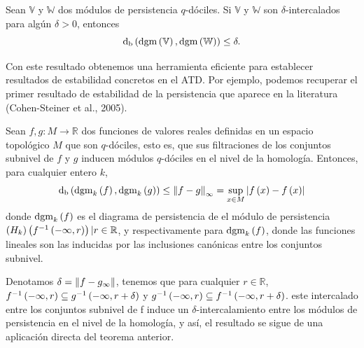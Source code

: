 \begin{teorema}\label{teo:EstPersist}
    Sean $\mathbb{V}$ y $\mathbb{W}$ dos m\'odulos de persistencia $q$-d\'ociles.
    Si $\mathbb{V}$ y $\mathbb{W}$ son $\delta$-intercalados para alg\'un $\delta>0$,
    entonces
    \begin{equation*}
        \mathrm{d}_{\mathrm{b}}
        \left(\mathrm{dgm}\left(\mathbb{V}\right),\mathrm{dgm}\left(\mathbb{W}\right)\right)\leq\delta.
    \end{equation*}
\end{teorema}

Con este resultado obtenemos una herramienta eficiente para establecer resultados de
estabilidad concretos en el ATD. Por ejemplo, podemos recuperar el primer resultado de
estabilidad de la persistencia que aparece en la literatura
(Cohen-Steiner et al., 2005)\cite{Cohen2005}.

\begin{teorema}
    Sean $f,g:M\rightarrow\mathbb{R}$ dos funciones de valores reales definidas en un
    espacio topol\'ogico $M$ que son $q$-d\'ociles, esto es, que sus filtraciones de
    los conjuntos subnivel de $f$ y $g$ inducen m\'odulos $q$-d\'ociles en el nivel de
    la homolog\'ia. Entonces, para cualquier entero $k$,
    \begin{equation*}
        \mathrm{d}_{\mathrm{b}}
        \left(\mathrm{dgm}_{k}\left(f\right),\mathrm{dgm}_{k}\left(g\right)\right)\leq
        \left\|f-g\right\|_{\infty}=
        \sup_{x\in M}\left|f\left(x\right)-f\left(x\right)\right|
    \end{equation*}
    donde $\mathrm{dgm}_{k}\left(f\right)$ es el diagrama de persistencia de el m\'odulo
    de persistencia $\left(H_{k}\right)\left(f^{-1}\left(-\infty,r\right)\right)|r\in\mathbb{R}$,
    y respectivamente para $\mathrm{dgm}_{k}\left(f\right)$,
    donde las funciones lineales son las inducidas por las inclusiones can\'onicas
    entre los conjuntos subnivel.
\end{teorema}
\begin{prueba}
    Denotamos $\delta=\left\|f-g_{\infty}\right\|$, tenemos que para cualquier $r\in\mathbb{R}$,
    $f^{-1}\left(-\infty,r\right)\subseteq g^{-1}\left(-\infty,r+\delta\right)$ y
    $g^{-1}\left(-\infty,r\right)\subseteq f^{-1}\left(-\infty,r+\delta\right)$.
    este intercalado entre los conjuntos subnivel de f induce un $\delta$-intercalamiento
    entre los m\'odulos de persistencia en el nivel de la homolog\'ia,
    y as\'i, el resultado se sigue de una aplicaci\'on directa del teorema anterior.
\end{prueba}

